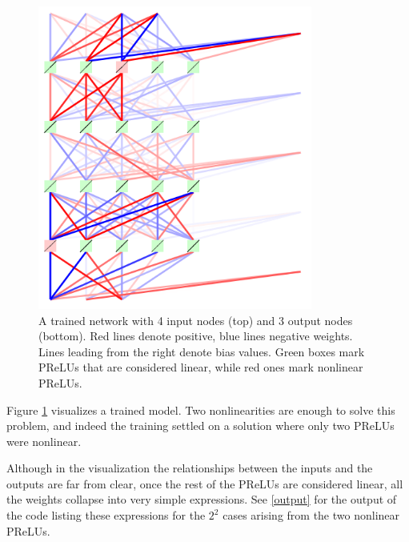 \documentclass{article}[12pt]
\begin{document}
\begin{figure}[ht]
\centering
\includegraphics[height=10cm]{example}
\caption{A trained network with 4 input nodes (top) and 3 output nodes (bottom). Red lines denote positive, blue lines negative weights.
Lines leading from the right denote bias values. Green boxes mark PReLUs that are considered linear, while red ones mark nonlinear PReLUs.}
\label{fig}
\end{figure}

Figure \ref{fig} visualizes a trained model. Two nonlinearities are enough to solve this problem, and indeed the training
settled on a solution where only two PReLUs were nonlinear.

Although in the visualization the relationships between the inputs and the outputs are far from clear,
once the rest of the PReLUs are considered linear, all the weights collapse into very simple expressions.
See \ref{output} for the output of the code listing these expressions for the $2^2$ cases arising from the
two nonlinear PReLUs.
\end{document}
